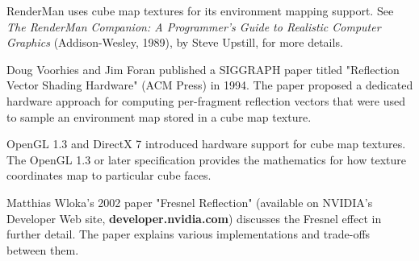 \documentclass[../main.tex]{subfiles}
\begin{document}
RenderMan uses cube map textures for its environment mapping support. See \textit{The RenderMan Companion: A Programmer's Guide to Realistic Computer Graphics} (Addison-Wesley, 1989), by Steve Upstill, for more details.

Doug Voorhies and Jim Foran published a SIGGRAPH paper titled "Reflection Vector Shading Hardware" (ACM Press) in 1994. The paper proposed a dedicated hardware approach for computing per-fragment reflection vectors that were used to sample an environment map stored in a cube map texture.

OpenGL 1.3 and DirectX 7 introduced hardware support for cube map textures. The OpenGL 1.3 or later specification provides the mathematics for how texture coordinates map to particular cube faces.

Matthias Wloka's 2002 paper "Fresnel Reflection" (available on NVIDIA's Developer Web site, \textbf{developer.nvidia.com}) discusses the Fresnel effect in further detail. The paper explains various implementations and trade-offs between them.
\end{document}
